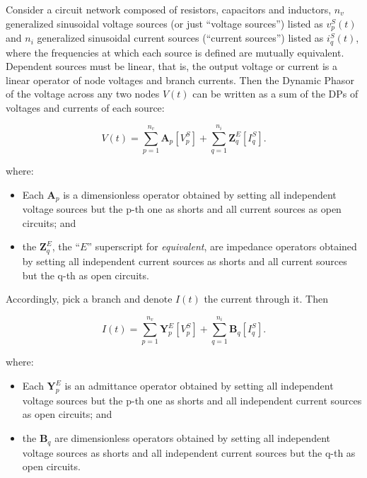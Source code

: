 \begin{theorem} \label{theo:superposition}%
Consider a circuit network composed of resistors, capacitors and inductors, $n_v$ generalized sinusoidal voltage sources (or just ``voltage sources'') listed as $v^S_p(t)$ and $n_i$ generalized sinusoidal current sources (``current sources'') listed as $i^S_q(t)$, where the frequencies at which each source is defined are mutually equivalent. Dependent sources must be linear, that is, the output voltage or current is a linear operator of node voltages and branch currents. Then the Dynamic Phasor of the voltage across any two nodes $V(t)$ can be written as a sum of the DPs of voltages and currents of each source:

\begin{equation} V(t) = \sum_{p=1}^{n_v} \mathbf{A}_p \left[V^S_p\right] + \sum_{q=1}^{n_i} \mathbf{Z}^E_q \left[I^S_q\right] .\label{theo:super_generic_vol}\end{equation}

	where:

\begin{itemize}
	\item Each $\mathbf{A}_p$ is a dimensionless operator obtained by setting all independent voltage sources but the p-th one as shorts and all current sources as open circuits; and
	\item the $\mathbf{Z}^E_q$, the ``$E$'' superscript for \textit{equivalent}, are impedance operators obtained by setting all independent current sources as shorts and all current sources but the q-th as open circuits.
\end{itemize}

	Accordingly, pick a branch and denote $I(t)$ the current through it. Then

\begin{equation} I(t) = \sum_{p=1}^{n_v} \mathbf{Y}_p^E \left[V^S_p\right] + \sum_{q=1}^{n_i} \mathbf{B}_q \left[I^S_q\right] .\label{theo:super_generic_curr}\end{equation}

	where:

\begin{itemize}
	\item Each $\mathbf{Y}_p^E$ is an admittance operator obtained by setting all independent voltage sources but the p-th one as shorts and all independent current sources as open circuits; and
	\item the $\mathbf{B}_q$ are dimensionless operators obtained by setting all independent voltage sources as shorts and all independent current sources but the q-th as open circuits.
\end{itemize}

\end{theorem}
